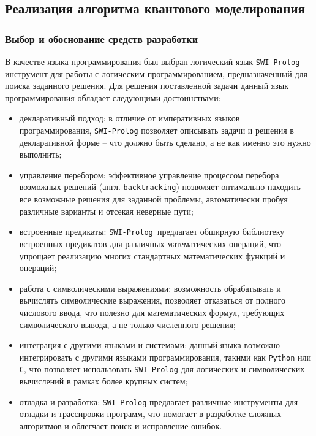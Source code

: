 \subsection{Реализация алгоритма квантового моделирования}

\subsubsection{Выбор и обоснование средств разработки}

В качестве языка программирования был выбран логический язык \texttt{SWI-Prolog}\cite{prolog} -- инструмент для работы с логическим программированием, предназначенный для поиска заданного решения. Для решения поставленной задачи данный язык программирования обладает следующими достоинствами:

\begin{itemize}
	\item декларативный подход: в отличие от императивных языков программирования, \texttt{SWI-Prolog} позволяет описывать задачи и решения в декларативной форме -- что должно быть сделано, а не как именно это нужно выполнить;
	
	\item управление перебором: эффективное управление процессом перебора возможных решений (англ. \texttt{backtracking}) позволяет оптимально находить все возможные решения для заданной проблемы, автоматически пробуя различные варианты и отсекая неверные пути;
	
	\item встроенные предикаты: \texttt{SWI-Prolog }предлагает обширную библиотеку встроенных предикатов для различных математических операций, что упрощает реализацию многих стандартных математических функций и операций;
	
	\item работа с символическими выражениями: возможность обрабатывать и вычислять символические выражения, позволяет отказаться от полного числового ввода, что полезно для математических формул, требующих символического вывода, а не только численного решения;
	
	\item интеграция с другими языками и системами: данный языка возможно интегрировать с другими языками программирования, такими как \texttt{Python} или \texttt{C}, что позволяет использовать \texttt{SWI-Prolog} для логических и символических вычислений в рамках более крупных систем;
	
	\item отладка и разработка: \texttt{SWI-Prolog} предлагает различные инструменты для отладки и трассировки программ, что помогает в разработке сложных алгоритмов и облегчает поиск и исправление ошибок.
\end{itemize}

